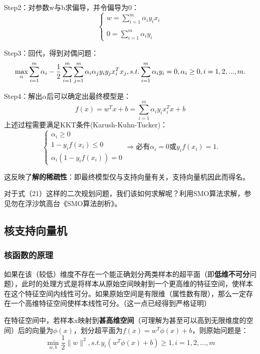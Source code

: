 Step2：对参数w与b求偏导，并令偏导为0：
\begin{equation}\begin{cases}w=\sum_{i=1}^m\alpha_iy_ix_i\\\\0=\sum_{i=1}^m\alpha_iy_i\end{cases}\end{equation}

Step3：回代，得到对偶问题：
\begin{equation}\max_\alpha\sum_{i=1}^m\alpha_i-\frac12\sum_{i=1}^m\sum_{j=1}^m\alpha_i\alpha_jy_iy_jx_i^Tx_j,\\s.t.\sum_{i=1}^m\alpha_iy_i=0,\alpha_i\geq0,i=1,2,...,m.\end{equation}

Step4：解出$\alpha $后可以确定出最终模型是：
\begin{equation}f(x)=w^Tx+b=\sum_{i=1}^m\alpha_iy_ix_i^Tx+b\end{equation}
上述过程需要满足KKT条件(Karush-Kuhn-Tucker)：
\begin{equation}\begin{cases}\alpha_i\geq0\\1-y_if(x_i)\leq0\\\alpha_i(1-y_if(x_i))=0\end{cases}\Rightarrow\text{必有}\alpha_i=0或y_if(x_i)=1.\end{equation}

这反映了\textbf{解的稀疏性}：即最终模型仅与支持向量有关，支持向量机因此而得名。

对于式（21）这样的二次规划问题，我们该如何求解呢？利用SMO算法求解，参见勿在浮沙筑高台《SMO算法剖析》。 

\subsection{核支持向量机}
\subsubsection{核函数的原理}
如果在该（较低）维度不存在一个能正确划分两类样本的超平面（即\textbf{低维不可分}问题），此时的处理方式是将样本从原始空间映射到一个更高维的特征空间，使样本在这个特征空间内线性可分。如果原始空间是有限维（属性数有限），那么一定存在一个高维特征空间使样本线性可分。（这一点已经得到严格证明）

在特征空间中，若样本x映射到\textbf{甚高维空间}（可理解为甚至可以高到无限维度的空间）后的向量为$\phi(x)$，划分超平面为$f(x)=w^T\phi(x)+b$，则原始问题是：
\begin{equation}\min_{w,b}\frac12\|w\|^2,s.t.y_i(w^T\phi(x)+b)\geq1,i=1,2,...,m\end{equation}


